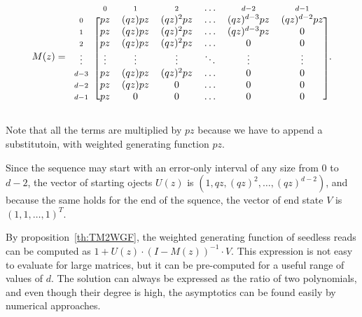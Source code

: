 \documentclass{article}
\begin{document}
\begin{equation*}
M(z) = 
\begin{blockarray}{ccccccc}
       & \scriptstyle{0} & \scriptstyle{1} & \scriptstyle{2} &
    \ldots &  \scriptstyle{d-2} & \scriptstyle{d-1} \\
\begin{block}{c[cccccc]}
\scriptstyle{0} & pz  & (qz)pz & (qz)^2pz & \ldots &
    (qz)^{d-3}pz & (qz)^{d-2}pz \\
\scriptstyle{1} & pz  & (qz)pz & (qz)^2pz & \ldots &
    (qz)^{d-3}pz & 0 \\
\scriptstyle{2} & pz  & (qz)pz & (qz)^2pz & \ldots &
    0 & 0 \\
\vdots & \vdots  & \vdots & \vdots & \ddots & \vdots & \vdots  \\
\scriptstyle{d-3} & pz  & (qz)pz & (qz)^2pz & \ldots & 0 & 0 \\
\scriptstyle{d-2} & pz  & (qz)pz & 0 & \ldots & 0 & 0 \\
\scriptstyle{d-1} & pz  & 0      & 0 & \ldots & 0 & 0 \\
\end{block}
\end{blockarray}.
\end{equation*}


Note that all the terms are multiplied by $pz$ because we have to append
a substitutoin, with weighted generating function $pz$.

Since the sequence may start with an error-only interval of any size from
$0$ to $d-2$, the vector of starting ojects $U(z)$ is $(1, qz, (qz)^2,
\ldots, (qz)^{d-2})$, and because the same holds for the end of the
squence, the vector of end state $V$ is $(1,1, \ldots, 1)^T$.

By proposition~\ref{th:TM2WGF}, the weighted generating function of
seedless reads can be computed as $1+U(z) \cdot (I-M(z))^{-1} \cdot V$.
This expression is not easy to evaluate for large matrices, but it can be
pre-computed for a useful range of values of $d$. The solution can always
be expressed as the ratio of two polynomials, and even though their degree
is high, the asymptotics can be found easily by numerical approaches.
\end{document}
